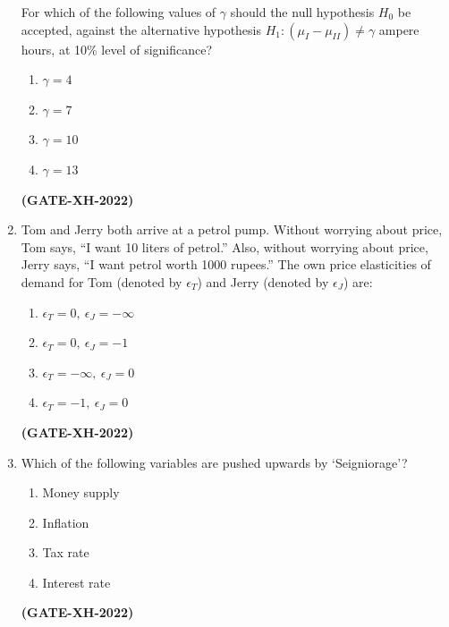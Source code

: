 \documentclass[journal]{IEEEtran}
\begin{document}
\begin{enumerate}
For which of the following values of $\gamma$ should the null hypothesis $H_0$ be accepted, against the alternative hypothesis $H_1: (\mu_I - \mu_{II}) \neq \gamma$ ampere hours, at 10\% level of significance?
\begin{multicols}{4}
\begin{enumerate}
\item $\gamma = 4$
\item $\gamma = 7$
\item $\gamma = 10$
\item $\gamma = 13$
\end{enumerate}
\end{multicols}
\hfill\textbf{(GATE-XH-2022)}

\item Tom and Jerry both arrive at a petrol pump. Without worrying about price, Tom says, “I want 10 liters of petrol.” Also, without worrying about price, Jerry says, “I want petrol worth 1000 rupees.” The own price elasticities of demand for Tom (denoted by $\epsilon_T$) and Jerry (denoted by $\epsilon_J$) are:
\begin{multicols}{2}
\begin{enumerate}
\item $\epsilon_T = 0, \ \epsilon_J = -\infty$
\item $\epsilon_T = 0, \ \epsilon_J = -1$
\item $\epsilon_T = -\infty, \ \epsilon_J = 0$
\item $\epsilon_T = -1, \ \epsilon_J = 0$
\end{enumerate}
\end{multicols}
\hfill\textbf{(GATE-XH-2022)}

\item Which of the following variables are pushed upwards by ‘Seigniorage’?
\begin{multicols}{2}
\begin{enumerate}
\item Money supply
\item Inflation
\item Tax rate
\item Interest rate
\end{enumerate}
\end{multicols}
\hfill\textbf{(GATE-XH-2022)}


\end{enumerate}
\end{document}
